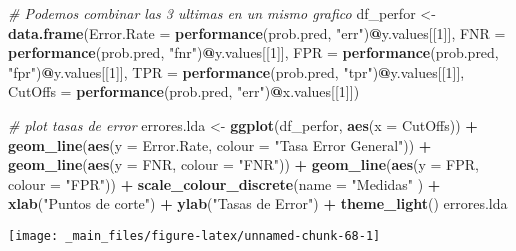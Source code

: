 \documentclass[]{book}
\newenvironment{Shaded}{\begin{snugshade}}{\end{snugshade}}
\newcommand{\CommentTok}[1]{\textcolor[rgb]{0.56,0.35,0.01}{\textit{#1}}}
\newcommand{\DataTypeTok}[1]{\textcolor[rgb]{0.13,0.29,0.53}{#1}}
\newcommand{\DecValTok}[1]{\textcolor[rgb]{0.00,0.00,0.81}{#1}}
\newcommand{\KeywordTok}[1]{\textcolor[rgb]{0.13,0.29,0.53}{\textbf{#1}}}
\newcommand{\NormalTok}[1]{#1}
\newcommand{\OperatorTok}[1]{\textcolor[rgb]{0.81,0.36,0.00}{\textbf{#1}}}
\newcommand{\StringTok}[1]{\textcolor[rgb]{0.31,0.60,0.02}{#1}}
\begin{document}
\begin{Shaded}
\begin{Highlighting}[]
\CommentTok{# Podemos combinar las 3 ultimas en un mismo grafico}
\NormalTok{df_perfor <-}\StringTok{ }\KeywordTok{data.frame}\NormalTok{(}\DataTypeTok{Error.Rate =} \KeywordTok{performance}\NormalTok{(prob.pred, }\StringTok{"err"}\NormalTok{)}\OperatorTok{@}\NormalTok{y.values[[}\DecValTok{1}\NormalTok{]],}
                        \DataTypeTok{FNR =} \KeywordTok{performance}\NormalTok{(prob.pred, }\StringTok{"fnr"}\NormalTok{)}\OperatorTok{@}\NormalTok{y.values[[}\DecValTok{1}\NormalTok{]],}
                        \DataTypeTok{FPR =} \KeywordTok{performance}\NormalTok{(prob.pred, }\StringTok{"fpr"}\NormalTok{)}\OperatorTok{@}\NormalTok{y.values[[}\DecValTok{1}\NormalTok{]],}
                        \DataTypeTok{TPR =} \KeywordTok{performance}\NormalTok{(prob.pred, }\StringTok{"tpr"}\NormalTok{)}\OperatorTok{@}\NormalTok{y.values[[}\DecValTok{1}\NormalTok{]],}
                        \DataTypeTok{CutOffs =} \KeywordTok{performance}\NormalTok{(prob.pred, }\StringTok{"err"}\NormalTok{)}\OperatorTok{@}\NormalTok{x.values[[}\DecValTok{1}\NormalTok{]])}

\CommentTok{# plot tasas de error}
\NormalTok{errores.lda <-}\StringTok{ }\KeywordTok{ggplot}\NormalTok{(df_perfor, }\KeywordTok{aes}\NormalTok{(}\DataTypeTok{x =}\NormalTok{ CutOffs)) }\OperatorTok{+}
\StringTok{  }\KeywordTok{geom_line}\NormalTok{(}\KeywordTok{aes}\NormalTok{(}\DataTypeTok{y =}\NormalTok{ Error.Rate, }\DataTypeTok{colour =} \StringTok{"Tasa Error General"}\NormalTok{)) }\OperatorTok{+}
\StringTok{  }\KeywordTok{geom_line}\NormalTok{(}\KeywordTok{aes}\NormalTok{(}\DataTypeTok{y =}\NormalTok{ FNR, }\DataTypeTok{colour =} \StringTok{"FNR"}\NormalTok{)) }\OperatorTok{+}
\StringTok{  }\KeywordTok{geom_line}\NormalTok{(}\KeywordTok{aes}\NormalTok{(}\DataTypeTok{y =}\NormalTok{ FPR, }\DataTypeTok{colour =} \StringTok{"FPR"}\NormalTok{)) }\OperatorTok{+}
\StringTok{  }\KeywordTok{scale_colour_discrete}\NormalTok{(}\DataTypeTok{name =} \StringTok{"Medidas"}\NormalTok{ ) }\OperatorTok{+}
\StringTok{  }\KeywordTok{xlab}\NormalTok{(}\StringTok{"Puntos de corte"}\NormalTok{) }\OperatorTok{+}\StringTok{ }\KeywordTok{ylab}\NormalTok{(}\StringTok{"Tasas de Error"}\NormalTok{) }\OperatorTok{+}
\StringTok{  }\KeywordTok{theme_light}\NormalTok{()}
\NormalTok{errores.lda}
\end{Highlighting}
\end{Shaded}

\begin{center}\texttt{[image: \_main\_files/figure-latex/unnamed-chunk-68-1]} \end{center}
\end{document}
